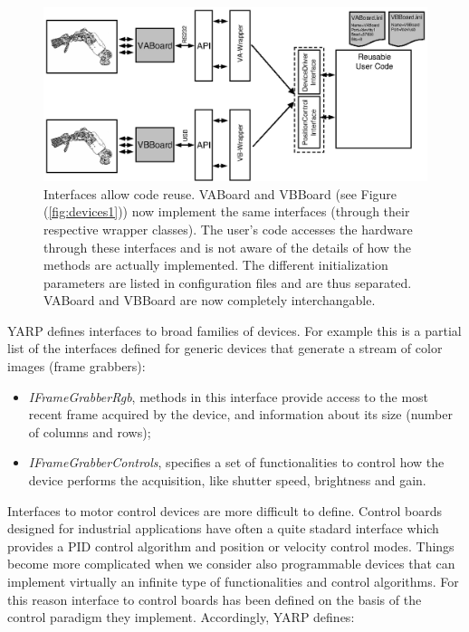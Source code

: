 \begin{figure}[tbp]
\centerline{
\includegraphics[width=24cm]{fig-devices2}
}
\caption{Interfaces allow code reuse. VABoard and VBBoard (see 
Figure (\ref{fig:devices1})) now implement
the same interfaces (through their respective wrapper classes). The user's 
code accesses the hardware through these interfaces and is not aware of 
the details of how the methods are actually implemented. The different 
initialization parameters are listed in configuration files and are thus 
separated. VABoard and VBBoard are now completely interchangable.}
\label{fig:devices2}
\end{figure}

YARP defines interfaces to broad families of devices. For 
example this is a partial list of the interfaces defined for generic 
devices that generate a stream of color images (frame grabbers):

\begin{itemize}

\item \emph{IFrameGrabberRgb}, methods in this interface 
provide access to the most recent frame acquired by the device, and 
information about its size (number of columns and rows);

\item \emph{IFrameGrabberControls}, specifies a set of functionalities 
to control how the device performs the acquisition, like shutter speed, 
brightness and gain.

\end{itemize}

Interfaces to motor control devices are more difficult to define. Control 
boards designed for industrial applications have often a quite stadard 
interface which provides a PID control algorithm and position or velocity 
control modes. Things become more complicated when we consider also 
programmable devices that can implement virtually an infinite type of 
functionalities and control algorithms. 
For this reason interface to control boards has been defined on the basis 
of the control paradigm they implement. Accordingly, YARP defines:

